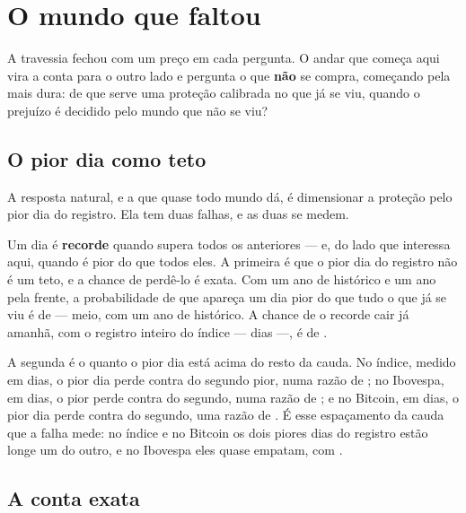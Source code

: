 \chapter{O mundo que faltou}\label{cap:faltou}

A travessia fechou com um preço em cada pergunta. O andar que começa aqui vira a conta para o outro
lado e pergunta o que \textbf{não} se compra, começando pela mais dura: de que serve uma proteção
calibrada no que já se viu, quando o prejuízo é decidido pelo mundo que não se viu?

\section{O pior dia como teto}

A resposta natural, e a que quase todo mundo dá, é dimensionar a proteção pelo pior dia do registro.
Ela tem duas falhas, e as duas se medem.

Um dia é \textbf{recorde} quando supera todos os anteriores --- e, do lado que interessa aqui,
quando é pior do que todos eles. A primeira é que o pior dia do registro não é um teto, e a chance
de perdê-lo é exata. Com um ano de
histórico e um ano pela frente, a probabilidade de que apareça um dia pior do que tudo o que já se
viu é de \numRecordeProbabilidade{} --- meio, com um ano de histórico. A chance de o recorde cair já
amanhã, com o registro inteiro do índice --- \numRecordeIndiceDias{} dias ---, é de
\numRecordeDoProximo{}.

A segunda é o quanto o pior dia está acima do resto da cauda. No índice, medido em \numRecordeIndiceDias{} dias, o pior dia perde \numRecordeIndicePior{} contra
\numRecordeIndiceSegundo{} do segundo pior, numa razão de \numRecordeIndiceRazao{}; no Ibovespa, em
\numRecordeIbovespaDias{} dias, o pior perde \numRecordeIbovespaPior{} contra
\numRecordeIbovespaSegundo{} do segundo, numa razão de \numRecordeIbovespaRazao{}; e no Bitcoin, em
\numRecordeBitcoinDias{} dias, o pior dia perde \numRecordeBitcoinPior{} contra
\numRecordeBitcoinSegundo{} do segundo, uma razão de \numRecordeBitcoinRazao{}. É esse espaçamento da cauda que a falha mede: no
índice e no Bitcoin os dois piores dias do registro estão longe um do outro, e no Ibovespa eles quase
empatam, com \numRecordeIbovespaRazao{}.

\section{A conta exata}

